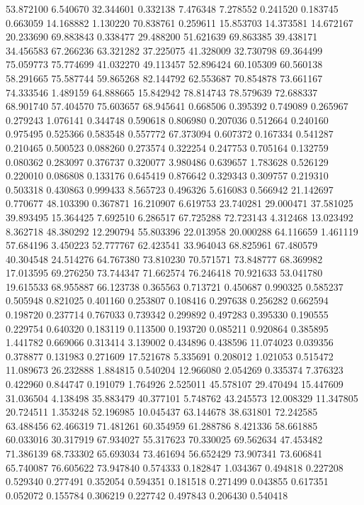 53.872100
6.540670
32.344601
0.332138
7.476348
7.278552
0.241520
0.183745
0.663059
14.168882
1.130220
70.838761
0.259611
15.853703
14.373581
14.672167
20.233690
69.883843
0.338477
29.488200
51.621639
69.863385
39.438171
34.456583
67.266236
63.321282
37.225075
41.328009
32.730798
69.364499
75.059773
75.774699
41.032270
49.113457
52.896424
60.105309
60.560138
58.291665
75.587744
59.865268
82.144792
62.553687
70.854878
73.661167
74.333546
1.489159
64.888665
15.842942
78.814743
78.579639
72.688337
68.901740
57.404570
75.603657
68.945641
0.668506
0.395392
0.749089
0.265967
0.279243
1.076141
0.344748
0.590618
0.806980
0.207036
0.512664
0.240160
0.975495
0.525366
0.583548
0.557772
67.373094
0.607372
0.167334
0.541287
0.210465
0.500523
0.088260
0.273574
0.322254
0.247753
0.705164
0.132759
0.080362
0.283097
0.376737
0.320077
3.980486
0.639657
1.783628
0.526129
0.220010
0.086808
0.133176
0.645419
0.876642
0.329343
0.309757
0.219310
0.503318
0.430863
0.999433
8.565723
0.496326
5.616083
0.566942
21.142697
0.770677
48.103390
0.367871
16.210907
6.619753
23.740281
29.000471
37.581025
39.893495
15.364425
7.692510
6.286517
67.725288
72.723143
4.312468
13.023492
8.362718
48.380292
12.290794
55.803396
22.013958
20.000288
64.116659
1.461119
57.684196
3.450223
52.777767
62.423541
33.964043
68.825961
67.480579
40.304548
24.514276
64.767380
73.810230
70.571571
73.848777
68.369982
17.013595
69.276250
73.744347
71.662574
76.246418
70.921633
53.041780
19.615533
68.955887
66.123738
0.365563
0.713721
0.450687
0.990325
0.585237
0.505948
0.821025
0.401160
0.253807
0.108416
0.297638
0.256282
0.662594
0.198720
0.237714
0.767033
0.739342
0.299892
0.497283
0.395330
0.190555
0.229754
0.640320
0.183119
0.113500
0.193720
0.085211
0.920864
0.385895
1.441782
0.669066
0.313414
3.139002
0.434896
0.438596
11.074023
0.039356
0.378877
0.131983
0.271609
17.521678
5.335691
0.208012
1.021053
0.515472
11.089673
26.232888
1.884815
0.540204
12.966080
2.054269
0.335374
7.376323
0.422960
0.844747
0.191079
1.764926
2.525011
45.578107
29.470494
15.447609
31.036504
4.138498
35.883479
40.377101
5.748762
43.245573
12.008329
11.347805
20.724511
1.353248
52.196985
10.045437
63.144678
38.631801
72.242585
63.488456
62.466319
71.481261
60.354959
61.288786
8.421336
58.661885
60.033016
30.317919
67.934027
55.317623
70.330025
69.562634
47.453482
71.386139
68.733302
65.693034
73.461694
56.652429
73.907341
73.606841
65.740087
76.605622
73.947840
0.574333
0.182847
1.034367
0.494818
0.227208
0.529340
0.277491
0.352054
0.594351
0.181518
0.271499
0.043855
0.617351
0.052072
0.155784
0.306219
0.227742
0.497843
0.206430
0.540418
